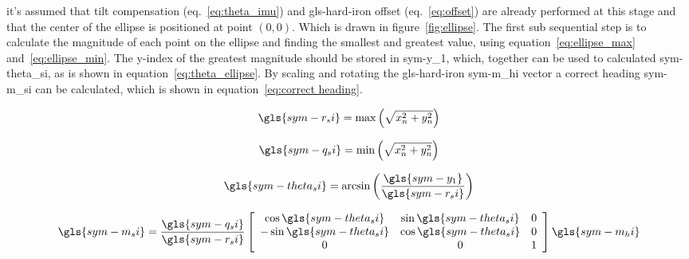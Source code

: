 it's assumed that tilt compensation (eq.~\ref{eq:theta_imu}) and \gls{gls-hard-iron} offset (eq.~\ref{eq:offset}) are
already performed at this stage and that the center of the ellipse is positioned at point \( (0,0) \). Which is drawn in
figure~\ref{fig:ellipse}. The first sub sequential step is to calculate the magnitude of each point on the ellipse and
finding the smallest and greatest value, using equation~\ref{eq:ellipse_max} and~\ref{eq:ellipse_min}. The y-index of
the greatest magnitude should be stored in \gls{sym-y_1}, which, together can be used to calculated \gls{sym-theta_si},
as is shown in equation~\ref{eq:theta_ellipse}. By scaling and rotating the \gls{gls-hard-iron} \gls{sym-m_hi} vector a
correct heading \gls{sym-m_si} can be calculated, which is shown in equation~\ref{eq:correct heading}.

\begin{equation}
    \label{eq:ellipse_max}
    \gls{sym-r_si} = \max \left(\sqrt{x_n^2 + y_n^2}\right)
\end{equation}

\begin{equation}
    \label{eq:ellipse_min}
    \gls{sym-q_si} = \min \left(\sqrt{x_n^2 + y_n^2}\right)
\end{equation}

\begin{equation}
    \label{eq:theta_ellipse}
    \gls{sym-theta_si} = \arcsin\left(\frac{\gls{sym-y_1}}{\gls{sym-r_si}}\right)
\end{equation}

\begin{equation}
    \label{eq:correct heading}
    \gls{sym-m_si} = \frac{\gls{sym-q_si}}{\gls{sym-r_si}} \left[\begin{array}{ccc}
                                                                     \cos \gls{sym-theta_si} & \sin
                                                                     \gls{sym-theta_si} & 0 \\
                                                                     -\sin \gls{sym-theta_si} & \cos
                                                                     \gls{sym-theta_si} & 0 \\
                                                                     0 & 0
                                                                     & 1
    \end{array}\right] \gls{sym-m_hi}
\end{equation}

